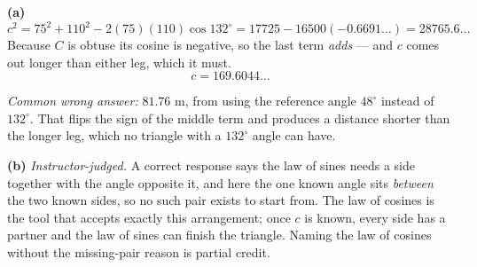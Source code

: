 \documentclass[12pt]{article}
\begin{document}
\textbf{(a)} \[ c^2 = 75^2 + 110^2 - 2(75)(110)\cos 132^\circ = 17725 - 16500(-0.6691\ldots) = 28765.6\ldots \]
Because $C$ is obtuse its cosine is negative, so the last term \emph{adds} --- and $c$ comes out longer than either leg, which it must.
\[ c = 169.6044\ldots \]

\smallskip
\noindent\textit{Common wrong answer:} $81.76$ m, from using the reference angle $48^\circ$ instead of $132^\circ$. That flips the sign of the middle term and produces a distance shorter than the longer leg, which no triangle with a $132^\circ$ angle can have.

\textbf{(b)} \emph{Instructor-judged.} A correct response says the law of sines needs a side together with the angle opposite it, and here the one known angle sits \emph{between} the two known sides, so no such pair exists to start from. The law of cosines is the tool that accepts exactly this arrangement; once $c$ is known, every side has a partner and the law of sines can finish the triangle. Naming the law of cosines without the missing-pair reason is partial credit.
\end{document}
